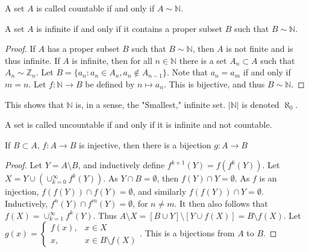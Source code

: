         \begin{definition}
        A set $A$ is called countable if and only if $A\sim \mathbb{N}$.
        \end{definition}
        \begin{theorem}
        A set $A$ is infinite if and only if it contains a proper subset $B$ such that $B\sim \mathbb{N}$.
        \end{theorem}
        \begin{proof}
        If $A$ has a proper subset $B$ such that $B\sim \mathbb{N}$, then $A$ is not finite and is thus infinite.
        If $A$ is infinite, then for all $n\in \mathbb{N}$ there is a set $A_n\subset A$ such that
        $A_n \sim \mathbb{Z}_n$. Let $B = \{a_n: a_n \in A_n, a_n \notin A_{n-1}\}$.
        Note that $a_{n} = a_{m}$ if and only if $m= n$. Let $f:\mathbb{N} \rightarrow B$
        be defined by $n\mapsto a_n$. This is bijective, and thus $B\sim \mathbb{N}$.
        \end{proof}
        \begin{remark}
        This shows that $\mathbb{N}$ is, in a sense, the "Smallest," infinite set. $|\mathbb{N}|$ is denoted $\aleph_0$.
        \end{remark}
        \begin{definition}
        A set is called uncountable if and only if it is infinite and not countable.
        \end{definition}
        \begin{lemma}
        If $B\subset A$, $f:A\rightarrow B$ is injective, then there is a bijection $g:A\rightarrow B$
        \end{lemma}
        \begin{proof}
        Let $Y = A\setminus B$, and inductively define $f^{k+1}(Y) = f(f^{k}(Y))$.
        Let $X = Y\cup (\cup_{k=0}^{\infty} f^{k}(Y))$. As $Y\cap B = \emptyset$, then
        $f(Y)\cap Y= \emptyset$. As $f$ is an injection, $f(f(Y))\cap f(Y)=\emptyset$,
        and similarly $f(f(Y))\cap Y = \emptyset$. Inductively, $f^{n}(Y)\cap f^{m}(Y) = \emptyset$,
        for $n\ne m$. It then also follows that $f(X) = \cup_{k=1}^{\infty} f^{k}(Y)$.
        Thus $A\setminus X = [B\cup Y]\setminus [Y\cup f(X)] = B\setminus f(X)$.
        Let $g(x) = \begin{cases} f(x), & x\in X \\ x, & x \in B\setminus f(X)\end{cases}$.
        This is a bijections from $A$ to $B$.
        \end{proof}
